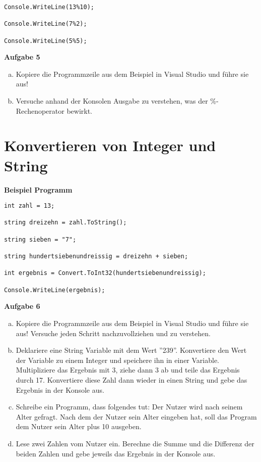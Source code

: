 \documentclass[a4paper,12pt]{article}
\newcommand{\Aufgabe}[1]{
  {
  \vspace*{0.5cm}
  \textsf{\textbf{Aufgabe #1}}
  \vspace*{0.2cm}
  
  }
}
\newcommand{\Definition}[1]{
  {
  \vspace*{0.5cm}
  \textsf{\textbf{#1}}
  \vspace*{0.2cm}
  
  }
}
\begin{document}
\begin{verbatim}
Console.WriteLine(13%10);

Console.WriteLine(7%2);

Console.WriteLine(5%5);
\end{verbatim}

\Aufgabe{5} 
\begin{enumerate}[a)]
\item
Kopiere die Programmzeile aus dem Beispiel in Visual Studio und führe sie aus!
\item 
Versuche anhand der Konsolen Ausgabe zu verstehen, was der \%-Rechenoperator bewirkt.
\end{enumerate}

\section{Konvertieren von Integer und String}
\Definition{Beispiel Programm}

\begin{verbatim}
int zahl = 13;

string dreizehn = zahl.ToString();

string sieben = "7";

string hundertsiebenundreissig = dreizehn + sieben;

int ergebnis = Convert.ToInt32(hundertsiebenundreissig);

Console.WriteLine(ergebnis);
\end{verbatim}

\Aufgabe{6} 
\begin{enumerate}[a)]
\item
Kopiere die Programmzeile aus dem Beispiel in Visual Studio und führe sie aus! Versuche jeden Schritt nachzuvollziehen und zu verstehen.
\item 
Deklariere eine String Variable mit dem Wert ''239''. Konvertiere den Wert der Variable zu einem Integer und speichere ihn in einer Variable.
Multipliziere das Ergebnis mit 3, ziehe dann 3 ab und teile das Ergebnis durch 17. Konvertiere diese Zahl dann wieder in einen String und gebe das Ergebnis in der Konsole aus.
\item
Schreibe ein Programm, dass folgendes tut:  Der Nutzer wird nach seinem Alter gefragt. Nach dem der Nutzer sein Alter eingeben hat, soll das Program dem Nutzer sein Alter plus 10 ausgeben.
\item
Lese zwei Zahlen vom Nutzer ein. Berechne die Summe und die Differenz der beiden Zahlen und gebe jeweils das Ergebnis in der Konsole aus.
\end{enumerate}

\end{document}
